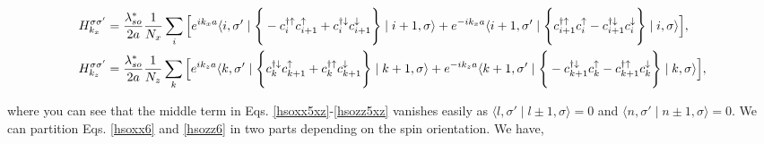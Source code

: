 \documentclass[10pt,prb,showpacs,amssymb,floatfix]{revtex4-1}
\newcommand{\sg}{\sigma}
\begin{document}
\begin{align}
\label{hsoxx6}
H_{k_x}^{\sigma \sigma'} &=  \frac{\lambda_{so}^*}{2a} \frac{1}{N_x}\sum_{i} \Big{[} e^{i k_x a} \langle i,\sigma' \mid   \Bigg{\{}  - c_{i}^{\dagger \uparrow} c_{i+1}^\uparrow  + c_{i}^{\dagger \downarrow} c_{i+1}^\downarrow \Bigg{\}} \mid i+1,\sigma\rangle + e^{-i k_x a} \langle i+1,\sigma'\mid   \Bigg{\{} c_{i+1}^{\dagger \uparrow} c_{i}^\uparrow   - c_{i+1}^{\dagger \downarrow} c_{i}^\downarrow \Bigg{\}} \mid i,\sigma\rangle \Big{]}, \\
H_{k_z}^{\sigma \sigma'} &=  \frac{\lambda_{so}^*}{2a} \frac{1}{N_z}\sum_{k} \Big{[} e^{i k_z a} \langle k,\sigma'  \mid \Bigg{\{}  c_{k}^{\dagger \downarrow} c_{k+1}^\uparrow  +  c_{k}^{\dagger \uparrow} c_{k+1}^\downarrow \Bigg{\}} \mid k+1,\sigma\rangle + e^{-i k_z a} \langle k+1,\sigma' \mid  \Bigg{\{} -c_{k+1}^{\dagger \downarrow} c_{k}^\uparrow   - c_{k+1}^{\dagger \uparrow} c_{k}^\downarrow  \Bigg{\}} \mid k,\sigma\rangle \Big{]}, 
\label{hsozz6}
\end{align}

where you can see that the middle term in Eqs. \eqref{hsoxx5xz}-\eqref{hsozz5xz} vanishes easily as $\langle l,\sg' \mid l \pm 1, \sg \rangle = 0$ and $\langle n,\sg' \mid n \pm 1, \sg \rangle = 0$. We can partition Eqs. \eqref{hsoxx6} and \eqref{hsozz6} in two parts depending on the spin orientation. We have,
\end{document}
